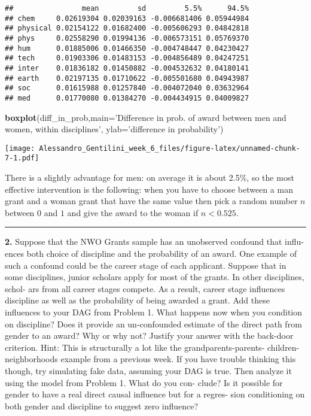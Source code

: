 \documentclass[]{article}
\newenvironment{Shaded}{\begin{snugshade}}{\end{snugshade}}
\newcommand{\KeywordTok}[1]{\textcolor[rgb]{0.13,0.29,0.53}{\textbf{{#1}}}}
\newcommand{\DataTypeTok}[1]{\textcolor[rgb]{0.13,0.29,0.53}{{#1}}}
\newcommand{\StringTok}[1]{\textcolor[rgb]{0.31,0.60,0.02}{{#1}}}
\newcommand{\NormalTok}[1]{{#1}}
\begin{document}
\begin{verbatim}
##                mean         sd         5.5%      94.5%
## chem     0.02619304 0.02039163 -0.006681406 0.05944984
## physical 0.02154122 0.01682400 -0.005606293 0.04842818
## phys     0.02558290 0.01994136 -0.006573151 0.05769370
## hum      0.01885006 0.01466350 -0.004748447 0.04230427
## tech     0.01903306 0.01483153 -0.004856489 0.04247251
## inter    0.01836182 0.01450882 -0.004532632 0.04180141
## earth    0.02197135 0.01710622 -0.005501680 0.04943987
## soc      0.01615988 0.01257840 -0.004072040 0.03632964
## med      0.01770080 0.01384270 -0.004434915 0.04009827
\end{verbatim}

\begin{Shaded}
\begin{Highlighting}[]
\KeywordTok{boxplot}\NormalTok{(diff_in_prob,}\DataTypeTok{main=}\StringTok{'Difference in prob. of award between men and women, within disciplines'}\NormalTok{,}
\DataTypeTok{ylab=}\StringTok{'difference in probability'}\NormalTok{)}
\end{Highlighting}
\end{Shaded}

\texttt{[image: Alessandro\_Gentilini\_week\_6\_files/figure-latex/unnamed-chunk-7-1.pdf]}

There is a slightly advantage for men: on average it is about 2.5\%, so
the most effective intervention is the following: when you have to
choose between a man grant and a woman grant that have the same value
then pick a random number \(n\) between \(0\) and \(1\) and give the
award to the woman if \(n<0.525\).

\begin{center}\rule{0.5\linewidth}{0.5pt}\end{center}

\textbf{2.} Suppose that the NWO Grants sample has an unobserved
confound that influ- ences both choice of discipline and the probability
of an award. One example of such a confound could be the career stage of
each applicant. Suppose that in some disciplines, junior scholars apply
for most of the grants. In other disciplines, schol- ars from all career
stages compete. As a result, career stage influences discipline as well
as the probability of being awarded a grant. Add these influences to
your DAG from Problem 1. What happens now when you condition on
discipline? Does it provide an un-confounded estimate of the direct path
from gender to an award? Why or why not? Justify your answer with the
back-door criterion. Hint: This is structurally a lot like the
grandparents-parents- children-neighborhoods example from a previous
week. If you have trouble thinking this though, try simulating fake
data, assuming your DAG is true. Then analyze it using the model from
Problem 1. What do you con- clude? Is it possible for gender to have a
real direct causal influence but for a regres- sion conditioning on both
gender and discipline to suggest zero influence?
\end{document}
